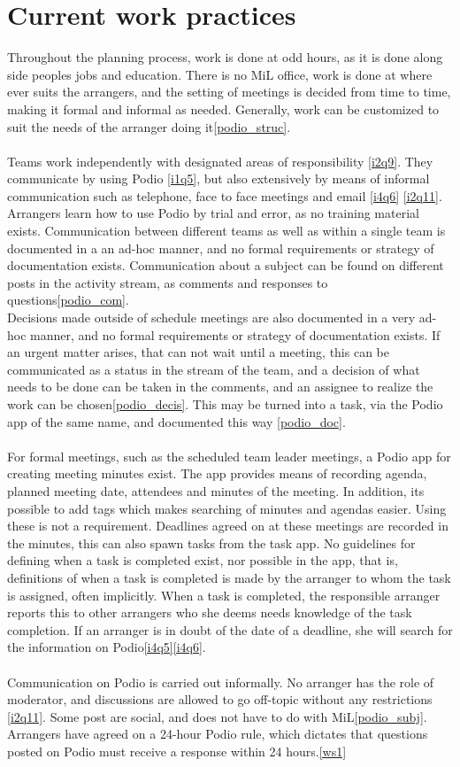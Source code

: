 \section{Current work practices}
Throughout the planning process, work is done at odd hours, as it is done along side peoples jobs and education. There is no MiL office, work is done at where ever suits the arrangers, and the setting of meetings is decided from time to time, making it formal and informal as needed. Generally, work can be customized to suit the needs of the arranger doing it\ref{podio_struc}.
\\ \\
Teams work independently with designated areas of responsibility \ref{i2q9}. They communicate by using Podio \ref{i1q5}, but also extensively by means of informal communication such as telephone, face to face meetings and email \ref{i4q6} \ref{i2q11}. Arrangers learn how to use Podio by trial and error, as no training material exists. Communication between different teams as well as within a single team is documented in a an ad-hoc manner, and no formal requirements or strategy of documentation exists. Communication about a subject can be found on different posts in the activity stream, as comments and responses to questions\ref{podio_com}. 
\\
Decisions made outside of schedule meetings are also documented in a very ad-hoc manner, and no formal requirements or strategy of documentation exists. If an urgent matter arises, that can not wait until a meeting, this can be communicated as a status in the stream of the team, and a decision of what needs to be done can be taken in the comments, and an assignee to realize the work can be chosen\ref{podio_decis}. This may be turned into a task, via the Podio app of the same name, and documented this way \ref{podio_doc}.
\\ \\
For formal meetings, such as the scheduled team leader meetings, a Podio app for creating meeting minutes exist. The app provides means of recording agenda, planned meeting date, attendees and minutes of the meeting. In addition, its possible to add tags which makes searching of minutes and agendas easier. Using these is not a requirement. Deadlines agreed on at these meetings are recorded in the minutes, this can also spawn tasks from the task app. No guidelines for defining when a task is completed exist, nor possible in the app, that is, definitions of when a task is completed is made by the arranger to whom the task is assigned, often implicitly. When a task is completed, the responsible arranger reports this to other arrangers who she deems needs knowledge of the task completion. If an arranger is in doubt of the date of a deadline, she will search for the information on Podio\ref{i4q5}\ref{i4q6}.
\\ \\
Communication on Podio is carried out informally. No arranger has the role of moderator, and discussions are allowed to go off-topic without any restrictions \ref{i2q11}. Some post are social, and does not have to do with MiL\ref{podio_subj}. Arrangers have agreed on a 24-hour Podio rule, which dictates that questions posted on Podio must receive a response within 24 hours.\ref{ws1}

